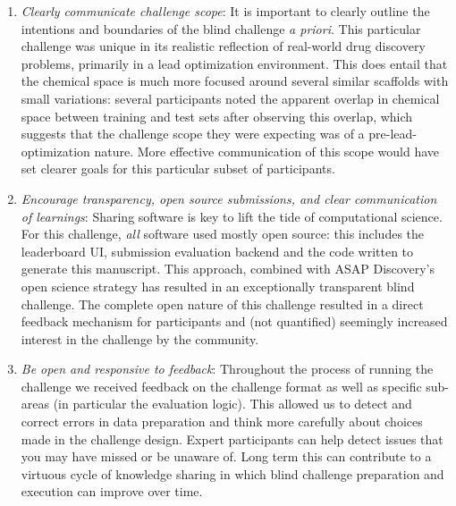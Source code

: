 \documentclass[journal=jcim,manuscript=article]{achemso}
\begin{document}
{\begin{enumerate}
    \item \textit{Clearly communicate challenge scope}: It is important to clearly outline the intentions and boundaries of the blind challenge \textit{a priori}. This particular challenge was unique in its realistic reflection of real-world drug discovery problems, primarily in a lead optimization environment. This does entail that the chemical space is much more focused around several similar scaffolds with small variations: several participants noted the apparent overlap in chemical space between training and test sets after observing this overlap, which suggests that the challenge scope they were expecting was of a pre-lead-optimization nature. More effective communication of this scope would have set clearer goals for this particular subset of participants.
    \item \textit{Encourage transparency, open source submissions, and clear communication of learnings}: Sharing software is key to lift the tide of computational science. For this challenge, \textit{all} software used mostly open source: this includes the leaderboard UI, submission evaluation backend and the code written to generate this manuscript. This approach, combined with ASAP Discovery's open science strategy has resulted in an exceptionally transparent blind challenge. The complete open nature of this challenge resulted in a direct feedback mechanism for participants and (not quantified) seemingly increased interest in the challenge by the community.
    \item \textit{Be open and responsive to feedback}: Throughout the process of running the challenge we received feedback on the challenge format as well as specific sub-areas (in particular the evaluation logic). This allowed us to detect and correct errors in data preparation and think more carefully about choices made in the challenge design. Expert participants can help detect issues that you may have missed or be unaware of. Long term this can contribute to a virtuous cycle of knowledge sharing in which blind challenge preparation and execution can improve over time. 

\end{enumerate}}
\end{document}
